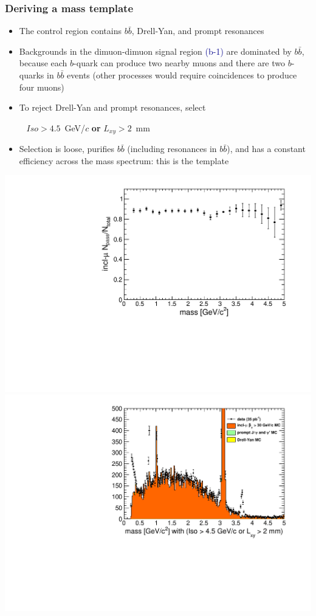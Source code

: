 \documentclass[compress]{beamer}
\begin{document}
\begin{frame}
\frametitle{Deriving a mass template}

\begin{itemize}
\item The control region contains $b\bar{b}$, Drell-Yan, and prompt resonances
\item Backgrounds in the dimuon-dimuon signal region
  \textcolor{darkblue}{(b-1)} are dominated by $b\bar{b}$, because
  each $b$-quark can produce two nearby muons and there are two
  $b$-quarks in $b\bar{b}$ events (other processes would require
  coincidences to produce four muons)
\item To reject Drell-Yan and prompt resonances, select

\mbox{ } \hfill $Iso > 4.5$~GeV/$c$ {\bf or} $L_{xy} > 2$~mm \hfill \mbox{ }

\item Selection is loose, purifies $b\bar{b}$ (including resonances in
  $b\bar{b}$), and has a constant efficiency across the mass spectrum: this is the template
\end{itemize}

\includegraphics[width=0.5\linewidth]{lowdimuon_mass_bcut_efficiency.pdf}
\includegraphics[width=0.5\linewidth]{lowdimuon_mass_bcuts.pdf}
\end{frame}
\end{document}
